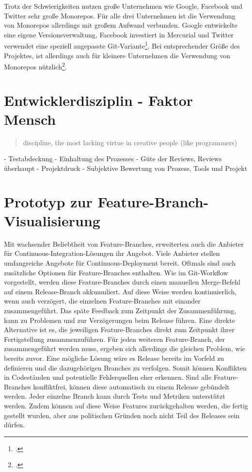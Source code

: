 Trotz der Schwierigkeiten nutzen große Unternehmen wie Google, Facebook und Twitter sehr große Monorepos. Für alle drei Unternehmen ist die Verwendung von Monorepos allerdings mit großem Aufwand verbunden. Google entwickelte eine eigene Versionsverwaltung, Facebook investiert in Mercurial und Twitter verwendet eine speziell angepasste Git-Variante\footcite{monorepos-wild}.
Bei entsprechender Größe des Projektes, ist allerdings auch für kleinere Unternehmen die Verwendung von Monorepos nützlich\footcite{hackernoon-positive-monorepo}.

\section{Entwicklerdisziplin - Faktor Mensch}
\label{sec:human-fail}
\blockquote {discipline, the most lacking virtue in creative people (like programmers)}
- Testabdeckung
- Einhaltung des Prozesses
- Güte der Reviews, Reviews überhaupt
- Projektdruck
- Subjektive Bewertung von Prozess, Tools und Projekt

\section{Prototyp zur Feature-Branch-Visualisierung}

Mit wachsender Beliebtheit von Feature-Branches, erweiterten auch die Anbieter für Continuous-Integration-Lösungen ihr Angebot. Viele Anbieter stellen umfangreiche Angebote für Continuous-Deployment bereit. Oftmals sind auch zusätzliche Optionen für Feature-Branches enthalten. Wie im Git-Workflow vorgestellt, werden diese Feature-Branches durch einen manuellen Merge-Befehl auf einem Release-Branch akkumuliert. Auf diese Weise werden kontinuierlich, wenn auch verzögert, die einzelnen Feature-Branches mit einander zusammengeführt. Das späte Feedback zum Zeitpunkt der Zusammenführung, kann zu Problemen und zur Verzögerungen beim Release führen. Eine direkte Alternative ist es, die jeweiligen Feature-Branches direkt zum Zeitpunkt ihrer Fertigstellung zusammenzuführen. Für jeden weiteren Feature-Branch, der zusammengeführt werden muss, ergeben sich allerdings die gleichen Problem, wie bereits zuvor.
Eine mögliche Lösung wäre es Release bereits im Vorfeld zu definieren und die dazugehörigen Branches zu verfolgen. Somit können Konflikten in Codeständen und potentielle Fehlerquellen eher erkennen. Sind alle Feature-Branches konfliktfrei, können diese automatisch zu einem Release gebündelt werden. Jeder einzelne Branch kann durch Tests und Metriken unterstützt werden. Zudem können auf diese Weise Features zurückgehalten werden, die fertig gestellt wurden, aber aus politischen Gründen noch nicht Teil des Releases sein dürfen.

